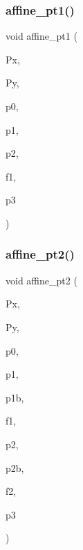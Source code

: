 \mbox{\label{draw_8_c_a2e16ad97ff53bc9d3eb4eeccc38e42a0}} 
\subsubsection{\texorpdfstring{affine\+\_\+pt1()}{affine\_pt1()}}
{\footnotesize\ttfamily void affine\+\_\+pt1 (\begin{DoxyParamCaption}\item[{\mbox{\hyperlink{galois_8h_a09fddde158a3a20bd2dcadb609de11dc}{I\+NT}} $\ast$}]{Px,  }\item[{\mbox{\hyperlink{galois_8h_a09fddde158a3a20bd2dcadb609de11dc}{I\+NT}} $\ast$}]{Py,  }\item[{\mbox{\hyperlink{galois_8h_a09fddde158a3a20bd2dcadb609de11dc}{I\+NT}}}]{p0,  }\item[{\mbox{\hyperlink{galois_8h_a09fddde158a3a20bd2dcadb609de11dc}{I\+NT}}}]{p1,  }\item[{\mbox{\hyperlink{galois_8h_a09fddde158a3a20bd2dcadb609de11dc}{I\+NT}}}]{p2,  }\item[{double}]{f1,  }\item[{\mbox{\hyperlink{galois_8h_a09fddde158a3a20bd2dcadb609de11dc}{I\+NT}}}]{p3 }\end{DoxyParamCaption})}

\mbox{\label{draw_8_c_a088fdf910eba215e82680a7e11d84d48}} 
\subsubsection{\texorpdfstring{affine\+\_\+pt2()}{affine\_pt2()}}
{\footnotesize\ttfamily void affine\+\_\+pt2 (\begin{DoxyParamCaption}\item[{\mbox{\hyperlink{galois_8h_a09fddde158a3a20bd2dcadb609de11dc}{I\+NT}} $\ast$}]{Px,  }\item[{\mbox{\hyperlink{galois_8h_a09fddde158a3a20bd2dcadb609de11dc}{I\+NT}} $\ast$}]{Py,  }\item[{\mbox{\hyperlink{galois_8h_a09fddde158a3a20bd2dcadb609de11dc}{I\+NT}}}]{p0,  }\item[{\mbox{\hyperlink{galois_8h_a09fddde158a3a20bd2dcadb609de11dc}{I\+NT}}}]{p1,  }\item[{\mbox{\hyperlink{galois_8h_a09fddde158a3a20bd2dcadb609de11dc}{I\+NT}}}]{p1b,  }\item[{double}]{f1,  }\item[{\mbox{\hyperlink{galois_8h_a09fddde158a3a20bd2dcadb609de11dc}{I\+NT}}}]{p2,  }\item[{\mbox{\hyperlink{galois_8h_a09fddde158a3a20bd2dcadb609de11dc}{I\+NT}}}]{p2b,  }\item[{double}]{f2,  }\item[{\mbox{\hyperlink{galois_8h_a09fddde158a3a20bd2dcadb609de11dc}{I\+NT}}}]{p3 }\end{DoxyParamCaption})}

